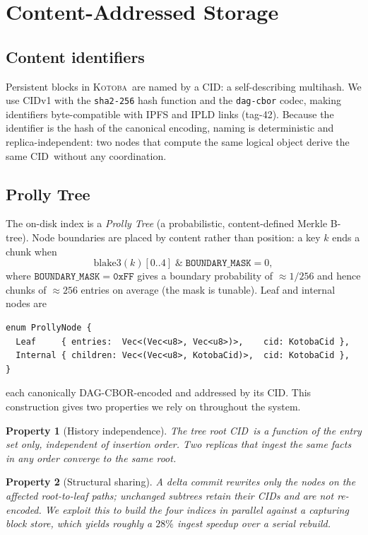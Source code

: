 \documentclass[11pt]{article}
\newtheorem{property}{Property}
\newcommand{\kotoba}{\textsc{Kotoba}}
\newcommand{\cid}{\textsf{CID}}
\begin{document}
\section{Content-Addressed Storage}
\label{sec:storage}

\subsection{Content identifiers}
Persistent blocks in \kotoba\ are named by a \cid: a self-describing
multihash. We use CIDv1 with the \texttt{sha2-256} hash function and the
\texttt{dag-cbor} codec, making identifiers byte-compatible with IPFS and IPLD
links (tag-42). Because the identifier is the hash of the canonical encoding,
naming is deterministic and replica-independent: two nodes that compute the same
logical object derive the same \cid\ without any coordination.

\subsection{Prolly Tree}
\label{sec:prolly}
The on-disk index is a \emph{Prolly Tree} (a probabilistic, content-defined
Merkle B-tree). Node boundaries are placed by content rather than position: a
key $k$ ends a chunk when
\[
\mathrm{blake3}(k)[0..4]\;\&\;\mathtt{BOUNDARY\_MASK} = 0,
\]
where $\mathtt{BOUNDARY\_MASK}=\mathtt{0xFF}$ gives a boundary probability of
$\approx 1/256$ and hence chunks of $\approx 256$ entries on average (the mask is
tunable). Leaf and internal nodes are
%
\begin{lstlisting}
enum ProllyNode {
  Leaf     { entries:  Vec<(Vec<u8>, Vec<u8>)>,    cid: KotobaCid },
  Internal { children: Vec<(Vec<u8>, KotobaCid)>,  cid: KotobaCid },
}
\end{lstlisting}
%
each canonically DAG-CBOR-encoded and addressed by its \cid. This construction
gives two properties we rely on throughout the system.

\begin{property}[History independence]
The tree root \cid\ is a function of the entry \emph{set} only, independent of
insertion order. Two replicas that ingest the same facts in any order converge
to the same root.
\end{property}

\begin{property}[Structural sharing]
A delta commit rewrites only the nodes on the affected root-to-leaf paths;
unchanged subtrees retain their \cid s and are not re-encoded. We exploit this to
build the four indices in parallel against a capturing block store, which yields
roughly a $28\%$ ingest speedup over a serial rebuild.
\end{property}
\end{document}
